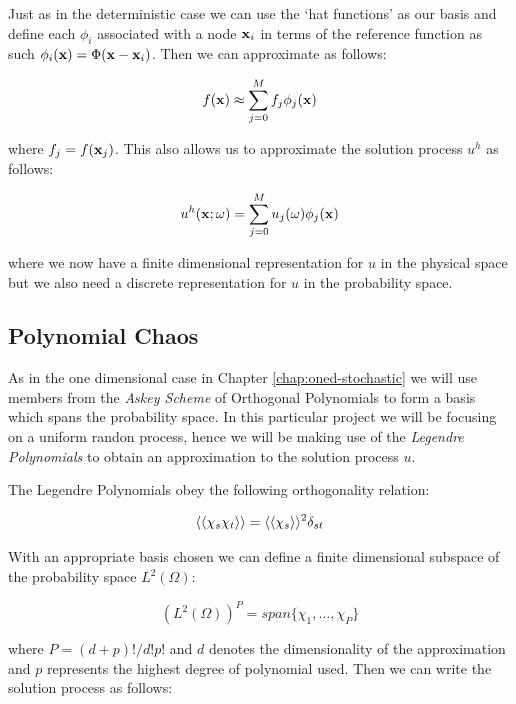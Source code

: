 Just as in the deterministic case we can use the `hat functions' as our basis
and define each $\phi_i$ associated with a node $\mathbf{x}_i$ in terms of the
reference function  as such
$\phi_i(\mathbf{x}) = \Phi(\mathbf{x} - \mathbf{x}_i)$. Then we can approximate as follows:

\begin{equation}\label{eq:twod-stochastic-f-approx}
    f(\mathbf{x}) \approx \sum_{j=0}^Mf_j\phi_j(\mathbf{x})
\end{equation}

where $f_j = f(\mathbf{x}_j)$. This also allows us to approximate the solution
process $u^h$ as follows:

\begin{equation}
    u^h(\mathbf{x};\omega) = \sum_{j=0}^Mu_j(\omega)\phi_j(\mathbf{x})
\end{equation}

where we now have a finite dimensional representation for $u$ in the physical
space but we also need a discrete representation for $u$ in the probability
space.

\subsection{Polynomial Chaos}

As in the one dimensional case in Chapter \ref{chap:oned-stochastic} we will
use members from the \textit{Askey Scheme} of Orthogonal Polynomials to form a
basis which spans the probability space. In this particular project we will be
focusing on a uniform randon process, hence we will be making use of the
\textit{Legendre Polynomials} to obtain an approximation to the solution process
$u$.

The Legendre Polynomials obey the following orthogonality relation:

\begin{equation}
    \left\langle\langle\chi_s\chi_t\right\rangle\rangle = \left\langle\langle\chi_s\right\rangle\rangle^2\delta_{st}
\end{equation}

With an appropriate basis chosen we can define a finite dimensional subspace of
the probability space $L^2(\Omega)$:

\begin{equation}
    (L^2(\Omega))^P = span\{\chi_1,\ldots,\chi_P\}
\end{equation}

where $P = (d + p)!/d!p!$ and $d$ denotes the dimensionality of the
approximation and $p$ represents the highest degree of polynomial used. Then we
can write the solution process as follows:

